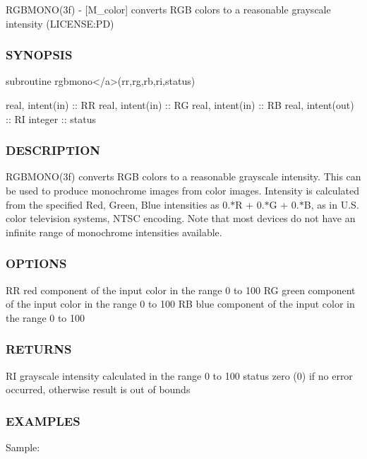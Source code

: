 R\+G\+B\+M\+O\+N\+O(3f) -\/ \mbox{[}M\+\_\+color\mbox{]} converts R\+GB colors to a reasonable grayscale intensity (L\+I\+C\+E\+N\+SE\+:PD) 

\subsubsection*{S\+Y\+N\+O\+P\+S\+IS}

\begin{DoxyVerb}subroutine rgbmono</a>(rr,rg,rb,ri,status)

 real, intent(in)  :: RR
 real, intent(in)  :: RG
 real, intent(in)  :: RB
 real, intent(out) :: RI
 integer           :: status
\end{DoxyVerb}


\subsubsection*{D\+E\+S\+C\+R\+I\+P\+T\+I\+ON}

R\+G\+B\+M\+O\+N\+O(3f) converts R\+GB colors to a reasonable grayscale intensity. This can be used to produce monochrome images from color images. Intensity is calculated from the specified Red, Green, Blue intensities as 0.$\ast$R + 0.$\ast$G + 0.$\ast$B, as in U.\+S. color television systems, N\+T\+SC encoding. Note that most devices do not have an infinite range of monochrome intensities available.

\subsubsection*{O\+P\+T\+I\+O\+NS}

RR red component of the input color in the range 0 to 100 RG green component of the input color in the range 0 to 100 RB blue component of the input color in the range 0 to 100

\subsubsection*{R\+E\+T\+U\+R\+NS}

RI grayscale intensity calculated in the range 0 to 100 status zero (0) if no error occurred, otherwise result is out of bounds

\subsubsection*{E\+X\+A\+M\+P\+L\+ES}

Sample\+:

